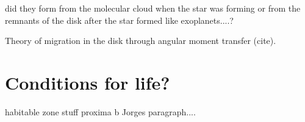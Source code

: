 did they form from the molecular cloud when the star was forming or from the remnants of the disk after the star formed like exoplanets....?


Theory of migration in the disk through  angular moment transfer (cite).


\section{Conditions for life?}
habitable zone stuff
proxima b
Jorges paragraph....
